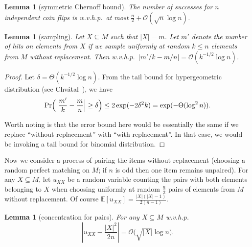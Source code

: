\documentclass{article}[11pt,a4paper]
\newtheorem{lemma}[definition]{Lemma}
\newcommand{\bigo}{\mathcal{O}}
\newcommand{\E}{\mathbb{E}}
\begin{document}
\begin{lemma}[symmetric Chernoff bound]
The number of successes for $n$ independent coin flips is w.v.h.p.\ at most  $\frac{n}2+\bigo(\sqrt{n} \log n)$.
\end{lemma}


\begin{lemma}[sampling]
\label{lem:sampling}
Let $X \subseteq M$ such that $|X| = m$. Let $m'$ denote the number of hits on
elements from $X$ if we sample uniformly at random $k \le n$ elements from $M$
without replacement. Then w.v.h.p.\ $\left|m'/k - m/n\right| = \bigo(k^{-1/2} \log n)$.
\end{lemma}


\begin{proof}
Let $\delta = \Theta( k^{-1/2} \log n)$.
From the tail bound for hypergeometric distribution (see Chv\'atal~\cite{chvatal}), we have
\[\Pr\Bigl( \Bigl|\frac{m'}{k} - \frac{m}{n}\Bigr| \ge \delta\Bigr) \le 2 \exp( -2 \delta^2 k) =  \exp( -\Theta(\log^2 n)).\]

Worth noting is that the error bound here would be essentially the same if we replace ``without replacement'' with ``with replacement''. In that case, we would be invoking a tail bound for binomial distribution.
\end{proof}

Now we consider a process of pairing the items without replacement (choosing a random
perfect matching on $M$; if $n$ is odd then one item remains unpaired). For any $X \subseteq M$,
let $u_{XX}$ be a random variable counting the pairs with both elements belonging to $X$ when
choosing uniformly at random $\frac{n}{2}$ pairs of elements from $M$ without replacement.
Of course $\E[u_{XX}] = \frac{|X|(|X|-1)}{2(n-1)}$.

\begin{lemma}[concentration for pairs]
\label{lem:pairs}
For any $X\subseteq M$ w.v.h.p.
\[\left| u_{XX} - \frac{|X|^2}{2n} \right| = \bigo\bigl(\sqrt{|X|} \log n\bigr).\]
\end{lemma}
\end{document}
